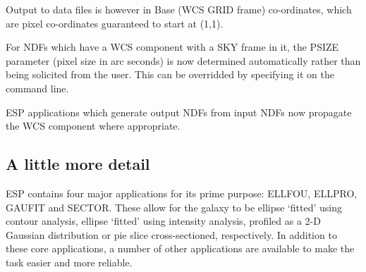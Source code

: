 \documentclass[twoside,11pt]{article}
\newcommand{\htmladdnormallink}[2]{#1}
\newcommand{\xref}[3]{#1}
\newcommand{\xlabel}[1]{}
\begin{document}
Output to data files is however in Base (WCS GRID frame) 
co-ordinates, which are pixel co-ordinates guaranteed to start 
at (1,1).

For NDFs which have a WCS component with a SKY frame in it, the
PSIZE parameter (pixel size in arc seconds) is now determined 
automatically rather than being solicited from the user.
This can be overridded by specifying it on the command line.

ESP applications which generate output NDFs from input NDFs now
propagate the WCS component where appropriate.





%

%
%

\subsection{A little more detail}
\xlabel{ALITTLEMOREDETAIL}

ESP contains four major applications for its prime purpose: ELLFOU,
ELLPRO, GAUFIT and SECTOR. These allow for the galaxy to be ellipse `fitted' 
using contour analysis, ellipse `fitted' using intensity analysis,
profiled as a 2-D Gaussian distribution or pie slice cross-sectioned, 
respectively. In addition to these core 
applications, a number of other applications are available to make the 
task easier and more reliable.
\end{document}
